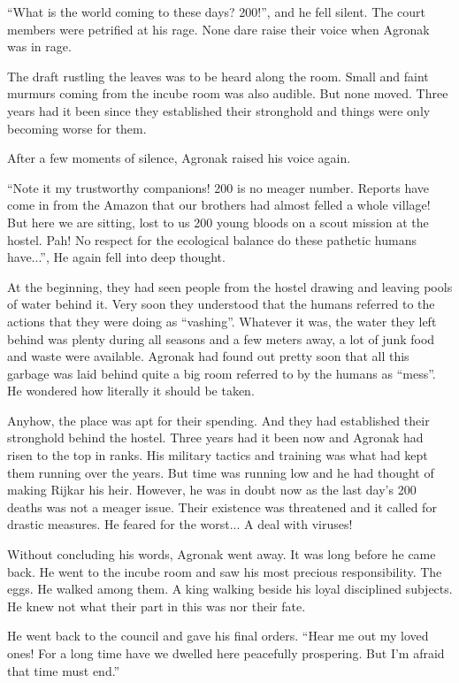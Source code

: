 \documentclass[twoside,11pt]{article}
\begin{document}
``What is the world coming to these days? 200!'', and he fell silent. The court members were petrified at his rage. None dare raise their voice when Agronak was in rage.

The draft rustling the leaves was to be heard along the room. Small and faint murmurs coming from the incube room was also audible. But none moved. Three years had it been since they established their stronghold and things were only becoming worse for them.

After a few moments of silence, Agronak raised his voice again.

``Note it my trustworthy companions! 200 is no meager number. Reports have come in from the Amazon that our brothers had almost felled a whole village! But here we are sitting, lost to us 200 young bloods on a scout mission at the hostel. Pah! No respect for the ecological balance do these pathetic humans have...'', He again fell into deep thought.

At the beginning, they had seen people from the hostel drawing and leaving pools of water behind it. Very soon they understood that the humans referred to the actions that they were doing as ``vashing''. Whatever it was, the water they left behind was plenty during all seasons and a few meters away, a lot of junk food and waste were available. Agronak had found out pretty soon that all this garbage was laid behind quite a big room referred to by the humans as ``mess''. He wondered how literally it should be taken.

Anyhow, the place was apt for their spending. And they had established their stronghold behind the hostel. Three years had it been now and Agronak had risen to the top in ranks. His military tactics and training was what had kept them running over the years. But time was running low and he had thought of making Rijkar his heir. However, he was in doubt now as the last day’s 200 deaths was not a meager issue. Their existence was threatened and it called for drastic measures. He feared for the worst... A deal with viruses!

Without concluding his words, Agronak went away. It was long before he came back. He went to the incube room and saw his most precious responsibility. The eggs. He walked among them. A king walking beside his loyal disciplined subjects. He knew not what their part in this was nor their fate.

He went back to the council and gave his final orders. ``Hear me out my loved ones! For a long time have we dwelled here peacefully prospering. But I'm afraid that time must end.''
\end{document}

